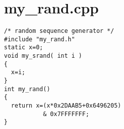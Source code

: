 \section{my\_rand.cpp}
\begin{verbatim}
/* random sequence generator */
#include "my_rand.h"
static x=0;
void my_srand( int i )
{
  x=i;
}
int my_rand()
{
  return x=(x*0x2DAAB5+0x6496205)
           & 0x7FFFFFFF;
}
\end{verbatim}
